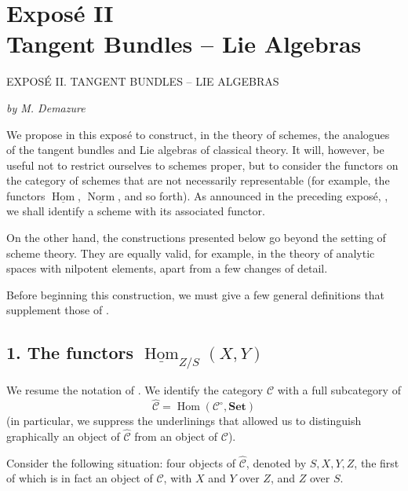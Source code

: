 
\chapter*{Expos\'e II\\Tangent Bundles -- Lie Algebras}
%
  {EXPOS\'E II. TANGENT BUNDLES -- LIE ALGEBRAS}

\begin{center}
  \textit{by M. Demazure}
\end{center}

We propose in this expos\'e to construct, in the theory of schemes, the
analogues of the tangent bundles and Lie algebras of classical theory. It
will, however, be useful not to restrict ourselves to schemes proper, but
to consider the functors on the category of schemes that are not
necessarily representable (for example, the functors
\(\underline{\operatorname{Hom}}\), \(\underline{\operatorname{Norm}}\),
and so forth). As announced in the preceding expos\'e, , we shall
identify a scheme with its associated functor.

On the other hand, the constructions presented below go beyond the setting
of scheme theory. They are equally valid, for example, in the theory of
analytic spaces with nilpotent elements, apart from a few changes of detail.

Before beginning this construction, we must give a few general definitions
that supplement those of .

\section*{1. The functors
  \(\underline{\operatorname{Hom}}_{Z/S}(X,Y)\)}

We resume the notation of . We identify the category \(\mathscr C\)
with a full subcategory of
\[
  \widehat{\mathscr C}
  =\operatorname{Hom}(\mathscr C^{\circ},\mathbf{Set})
\]
(in particular, we suppress the underlinings that allowed us to distinguish
graphically an object of \(\widehat{\mathscr C}\) from an object of
\(\mathscr C\)).

Consider the following situation: four objects of
\(\widehat{\mathscr C}\), denoted by \(S,X,Y,Z\), the first of which is in
fact an object of \(\mathscr C\), with \(X\) and \(Y\) over \(Z\), and
\(Z\) over \(S\).

